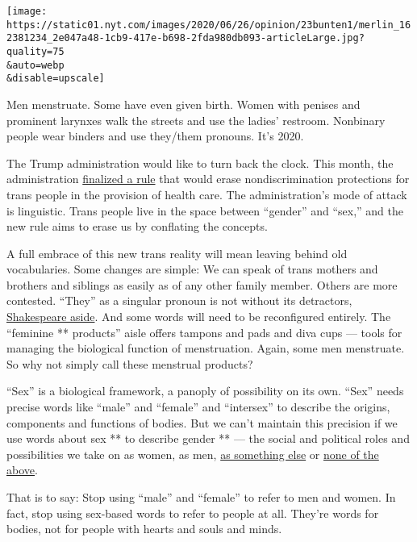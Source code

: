 \texttt{[image: https://static01.nyt.com/images/2020/06/26/opinion/23bunten1/merlin\_162381234\_2e047a48-1cb9-417e-b698-2fda980db093-articleLarge.jpg?quality=75\\\&auto=webp\\\&disable=upscale]}

Men menstruate. Some have even given birth. Women with penises and
prominent larynxes walk the streets and use the ladies' restroom.
Nonbinary people wear binders and use they/them pronouns. It's 2020.

The Trump administration would like to turn back the clock. This month,
the administration
\href{https://www.nytimes.com/2020/06/12/us/politics/trump-transgender-rights.html}{finalized
a rule} that would erase nondiscrimination protections for trans people
in the provision of health care. The administration's mode of attack is
linguistic. Trans people live in the space between ``gender'' and
``sex,'' and the new rule aims to erase us by conflating the concepts.

A full embrace of this new trans reality will mean leaving behind old
vocabularies. Some changes are simple: We can speak of trans mothers and
brothers and siblings as easily as of any other family member. Others
are more contested. ``They'' as a singular pronoun is not without its
detractors,
\href{http://itre.cis.upenn.edu/~myl/languagelog/archives/002748.html}{Shakespeare
aside}. And some words will need to be reconfigured entirely. The
``feminine ** products'' aisle offers tampons and pads and diva cups ---
tools for managing the biological function of menstruation. Again, some
men menstruate. So why not simply call these menstrual products?

``Sex'' is a biological framework, a panoply of possibility on its own.
``Sex'' needs precise words like ``male'' and ``female'' and
``intersex'' to describe the origins, components and functions of
bodies. But we can't maintain this precision if we use words about sex
** to describe gender ** --- the social and political roles and
possibilities we take on as women, as men,
\href{https://www.nytimes.com/interactive/2018/11/16/magazine/tech-design-instagram-gender.html?action=click\&module=RelatedCoverage\&pgtype=Article\&region=Footer}{as
something else} or
\href{https://www.nytimes.com/2019/06/04/magazine/gender-nonbinary.html}{none
of the above}.

That is to say: Stop using ``male'' and ``female'' to refer to men and
women. In fact, stop using sex-based words to refer to people at all.
They're words for bodies, not for people with hearts and souls and
minds.

